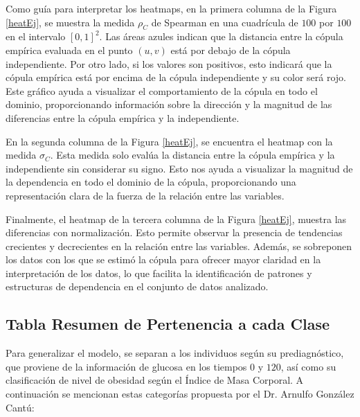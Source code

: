 Como guía para interpretar los heatmaps, en la primera columna de la Figura \ref{heatEj}, se muestra la medida $\rho_C$ de Spearman en una cuadrícula de $100$ por $100$ en el intervalo $[0, 1]^2$. Las áreas azules indican que la distancia entre la cópula empírica evaluada en el punto $(u, v)$ está por debajo de la cópula independiente. Por otro lado, si los valores son positivos, esto indicará que la cópula empírica está por encima de la cópula independiente y su color será rojo. Este gráfico ayuda a visualizar el comportamiento de la cópula en todo el dominio, proporcionando información sobre la dirección y la magnitud de las diferencias entre la cópula empírica y la independiente.

En la segunda columna de la Figura \ref{heatEj}, se encuentra el heatmap con la medida $\sigma_C$. Esta medida solo evalúa la distancia entre la cópula empírica y la independiente sin considerar su signo. Esto nos ayuda a visualizar la magnitud de la dependencia en todo el dominio de la cópula, proporcionando una representación clara de la fuerza de la relación entre las variables.

Finalmente, el heatmap de la tercera columna de la Figura \ref{heatEj}, muestra las diferencias con normalización. Esto permite observar la presencia de tendencias crecientes y decrecientes en la relación entre las variables. Además, se sobreponen los datos con los que se estimó la cópula para ofrecer mayor claridad en la interpretación de los datos, lo que facilita la identificación de patrones y estructuras de dependencia en el conjunto de datos analizado.


\subsection{Tabla Resumen de Pertenencia a cada Clase}\label{subTabla}

Para generalizar el modelo, se separan a los individuos según su prediagnóstico, que proviene de la información de glucosa en los tiempos $0$ y $120$, así como su clasificación de nivel de obesidad según el Índice de Masa Corporal. A continuación se mencionan estas categorías propuesta por el Dr. Arnulfo González Cantú:

